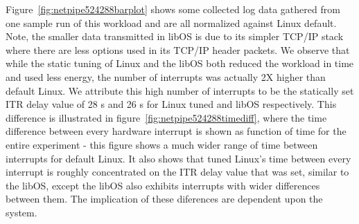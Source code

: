 
Figure~\ref{fig:netpipe524288barplot} shows some collected log data gathered from one sample run of this workload and are all normalized against Linux default. Note, the smaller data transmitted in libOS is due to its simpler TCP/IP stack where there are less options used in its TCP/IP header packets. We observe that while the static tuning of Linux and the libOS both reduced the workload in time and used less energy, the number of interrupts was actually 2X higher than default Linux. We attribute this high number of interrupts to be the statically set ITR delay value of 28 \micro s and 26 \micro s for Linux tuned and libOS respectively. This difference is illustrated in figure~\ref{fig:netpipe524288timediff}, where the time difference between every hardware interrupt is shown as function of time for the entire experiment - this figure shows a much wider range of time between interrupts for default Linux. It also shows that tuned Linux's time between every interrupt is roughly concentrated on the ITR delay value that was set, similar to the libOS, except the libOS also exhibits interrupts with wider differences between them. The implication of these diferences are dependent upon the system.

